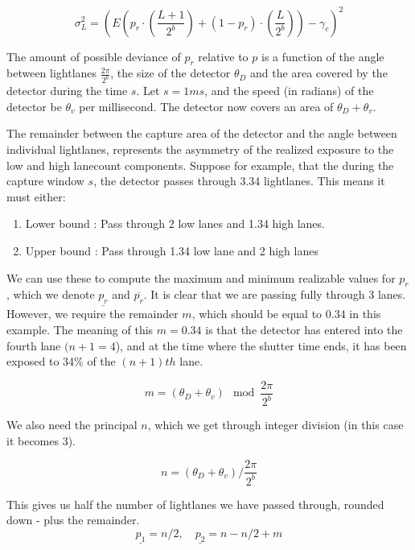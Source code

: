 \documentclass[notitlepage]{article}
\begin{document}
\begin{equation}
	\sigma_L^2 = \left(E\left(p_r \cdot (\frac{L+1}{2^b}) + (1-p_r) \cdot (\frac{ L }{2^b}) \right)- \gamma_c \right)^2
	\label{eq:TwinkleVariance2}
\end{equation}

The amount of possible deviance of $p_r$ relative to $p$ is a function of the angle between lightlanes $\frac{2\pi}{2^b}$, the size of the detector $\theta_D$ and the area covered by the detector during the time $s$. Let $s = 1 ms$, and the speed (in radians) of the detector be $\theta_v$ per millisecond. The detector now covers an area of $\theta_D + \theta_v$.

The remainder between the capture area of the detector and the angle between individual lightlanes, represents the asymmetry of the realized exposure to the low and high lanecount components. Suppose for example, that the during the capture window $s$, the detector passes through 3.34 lightlanes. This means it must either:

\begin{enumerate}
\item Lower bound : Pass through 2 low lanes and 1.34 high lanes.
\item Upper bound : Pass through 1.34 low lane and 2 high lanes
\end{enumerate}

We can use these to compute the maximum and minimum realizable values for $p_r$, which we denote $\underline{p_r}$ and $\overline{p_r}$. It is clear that we are passing fully through 3 lanes. However, we require the remainder $m$, which should be equal to 0.34 in this example. The meaning of this $m = 0.34$ is that the detector has entered into the fourth lane $(n+1 = 4$), and at the time where the shutter time ends, it has been exposed to 34\% of the $(n+1)th$ lane. 

\begin{equation}
m =  \left(\theta_D + \theta_v  \right) \mod \frac{2\pi}{2^b}
\end{equation}

We also need the principal $n$, which we get through integer division (in this case it becomes 3).

\begin{equation}
n =  \left(\theta_D + \theta_v  \right) / \frac{2\pi}{2^b}
\end{equation}

This gives us half the number of lightlanes we have passed through, rounded down - plus the remainder. 
\begin{equation}
\underline{p_1} = n / 2, \quad \underline{p_2}		 = 	n- n/2 + m
\end{equation}
\end{document}

